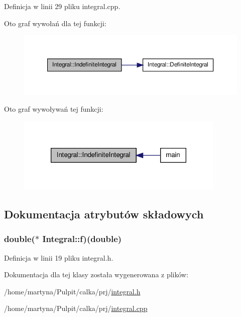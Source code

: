 \-Definicja w linii 29 pliku integral.\-cpp.



\-Oto graf wywołań dla tej funkcji\-:\nopagebreak
\begin{figure}[H]
\begin{center}
\leavevmode
\includegraphics[width=350pt]{class_integral_ac91a8edc240a85b9efcfe3f3b75e585e_cgraph}
\end{center}
\end{figure}




\-Oto graf wywoływań tej funkcji\-:\nopagebreak
\begin{figure}[H]
\begin{center}
\leavevmode
\includegraphics[width=282pt]{class_integral_ac91a8edc240a85b9efcfe3f3b75e585e_icgraph}
\end{center}
\end{figure}




\subsection{\-Dokumentacja atrybutów składowych}
\hypertarget{class_integral_a12d960433639c75917e0d0758498b0da}{
\subsubsection[{f}]{\setlength{\rightskip}{0pt plus 5cm}double($\ast$ {\bf \-Integral\-::f})(double)}}\label{class_integral_a12d960433639c75917e0d0758498b0da}


\-Definicja w linii 19 pliku integral.\-h.



\-Dokumentacja dla tej klasy została wygenerowana z plików\-:\begin{DoxyCompactItemize}
\item 
/home/martyna/\-Pulpit/calka/prj/\hyperlink{integral_8h}{integral.\-h}\item 
/home/martyna/\-Pulpit/calka/prj/\hyperlink{integral_8cpp}{integral.\-cpp}\end{DoxyCompactItemize}
